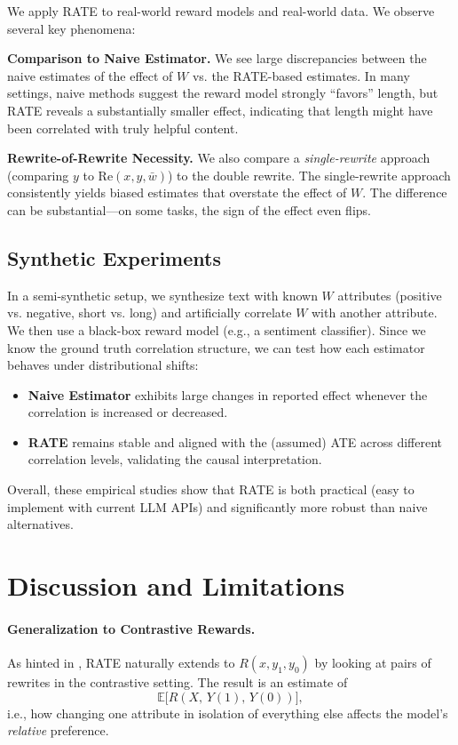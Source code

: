 \documentclass{article}
\theoremstyle{definition}
\newcommand{\EE}{\mathbb{E}}
\begin{document}
We apply RATE to real-world reward models and real-world data. We observe several key phenomena:

\textbf{Comparison to Naive Estimator.} We see large discrepancies between the naive estimates of the effect of $W$ vs. the RATE-based estimates. In many settings, naive methods suggest the reward model strongly ``favors'' length, but RATE reveals a substantially smaller effect, indicating that length might have been correlated with truly helpful content.

\textbf{Rewrite-of-Rewrite Necessity.} We also compare a \emph{single-rewrite} approach (comparing $y$ to $\text{Re}(x, y, \bar{w})$) to the double rewrite. The single-rewrite approach consistently yields biased estimates that overstate the effect of $W$. The difference can be substantial---on some tasks, the sign of the effect even flips.

\subsection{Synthetic Experiments}

In a semi-synthetic setup, we synthesize text with known $W$ attributes (positive vs. negative, short vs. long) and artificially correlate $W$ with another attribute. We then use a black-box reward model (e.g., a sentiment classifier). Since we know the ground truth correlation structure, we can test how each estimator behaves under distributional shifts:
\begin{itemize}
    \item \textbf{Naive Estimator} exhibits large changes in reported effect whenever the correlation is increased or decreased.
    \item \textbf{RATE} remains stable and aligned with the (assumed) ATE across different correlation levels, validating the causal interpretation.
\end{itemize}

Overall, these empirical studies show that RATE is both practical (easy to implement with current LLM APIs) and significantly more robust than naive alternatives.

\section{Discussion and Limitations}
\label{sec:discussion}

\paragraph{Generalization to Contrastive Rewards.}
As hinted in , RATE naturally extends to $R(x, y_1, y_0)$ by looking at pairs of rewrites in the contrastive setting. The result is an estimate of
\[
\EE\bigl[R(X,\,Y(1),\,Y(0))\bigr],
\]
i.e., how changing one attribute in isolation of everything else affects the model's \emph{relative} preference.
\end{document}
